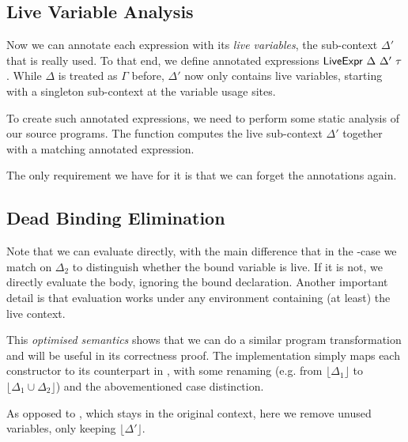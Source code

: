 \documentclass[11pt,a4paper]{article}
\newcommand{\Floor}[1]{\lfloor #1 \rfloor\xspace}
\begin{document}
\subsection{Live Variable Analysis}

Now we can annotate each expression with its \emph{live variables},
the sub-context $\Delta'$ that is really used.
To that end, we define annotated expressions
$\AgdaDatatype{LiveExpr}\ \Delta\ \Delta'\ \tau$.
While $\Delta$ is treated as $\Gamma$ before, $\Delta'$ now only contains live variables,
starting with a singleton sub-context at the variable usage sites.

\CodeLiveExpr

To create such annotated expressions, we need to perform
some static analysis of our source programs.
The function  computes the live sub-context $\Delta'$
together with a matching annotated expression.

\CodeLiveAnalyse

The only requirement we have for it is that we can forget the annotations again.

\CodeLiveForgetSignature

\CodeLiveAnalysePreservesSignature


\subsection{Dead Binding Elimination}

Note that we can evaluate  directly, with the main difference
that in the -case we match on $\Delta_2$ to distinguish whether the bound variable is live.
If it is not, we directly evaluate the body, ignoring the bound declaration.
Another important detail is that evaluation works under any environment containing (at least) the live context.

\CodeLiveEvalLive

This \emph{optimised semantics} shows that we can do a similar program transformation
and will be useful in its correctness proof.
The implementation simply maps each constructor to its counterpart in ,
with some renaming
(e.g. from $\Floor{\Delta_1}$ to $\Floor{\Delta_1 \cup \Delta_2}$)
and the abovementioned case distinction.

\CodeLiveDbe
\CodeLiveRestrictedRefSignature

As opposed to , which stays in the original context,
here we remove unused variables, only keeping $\Floor{\Delta'}$.
\end{document}
